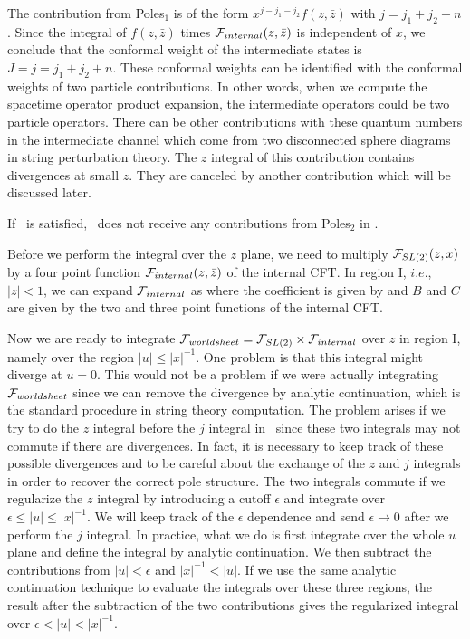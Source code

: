 The contribution from Poles$_1$ is of the form
$x^{j-j_1-j_2} f(z,\bar{z})$ with $j=j_1+j_2+n$.
Since the integral of $f(z,\bar{z})$ times ${\cal F}_{internal}(z,\bar z)$
is independent of $x$, we conclude that the conformal
weight of the intermediate states is $J = j=j_1 + j_2 + n$.
These conformal weights  can be identified with the conformal
weights of two particle contributions. In other words, when we
compute the spacetime operator product expansion, the intermediate
operators could be two particle operators.
There can be  other contributions with these quantum numbers in the
intermediate channel which come from two disconnected
sphere diagrams in string perturbation theory.
The $z$ integral of this contribution contains
divergences at small $z$. They are canceled by another contribution
which will be discussed later.


If \physcond\ is satisfied, \monodromy\ does  not receive
any contributions from Poles$_2$ in \poles .

Before we perform the integral over the $z$ plane,
we need to multiply ${\cal F}_{SL(2)}(z,x)$
by a four point function ${\cal F}_{internal}(z, \bar z)$
of the internal CFT. In
region I, $i.e.$, $|z|<1$, we can expand ${\cal F}_{internal}$
as
\eqn{}
where the coefficient is given by
\eqn{}
and $B$ and $C$  are given by the two and three
point functions of the internal CFT.


Now we are ready to integrate ${\cal F}_{worldsheet}
={\cal F}_{SL(2)}\times {\cal F}_{internal}$
over $z$ in  region I, namely
 over the region $|u| \leq |x|^{-1}$.
One problem is that this integral might diverge at $u=0$.
This would not be a problem if we were actually integrating
${\cal F}_{worldsheet}$ since
we can remove the divergence by analytic continuation,
which is the standard procedure in string theory
computation. The problem arises if we try to do
the $z$ integral before the $j$ integral in \expres\ since these
two integrals may not commute if there are divergences.
In fact, it is necessary to keep track of these possible
divergences and to be careful about the exchange of
the $z$ and $j$ integrals in order to recover the correct
pole structure. The two integrals commute if we regularize
the $z$ integral by introducing a cutoff $\epsilon$
and integrate over $\epsilon \leq |u| \leq |x|^{-1}$.
We will keep track of the $\epsilon$ dependence and
send $\epsilon \rightarrow 0$ after we perform the $j$ integral.
In practice, what we do is first integrate
over the whole $u$ plane and define the integral by analytic
continuation. We then subtract the contributions from
$|u| < \epsilon$ and $|x|^{-1} < |u|$.
If we use the same analytic continuation technique to evaluate
the integrals over these three regions,
the result after the subtraction of the two contributions
gives the regularized
integral over $\epsilon < |u| < |x|^{-1}$.


